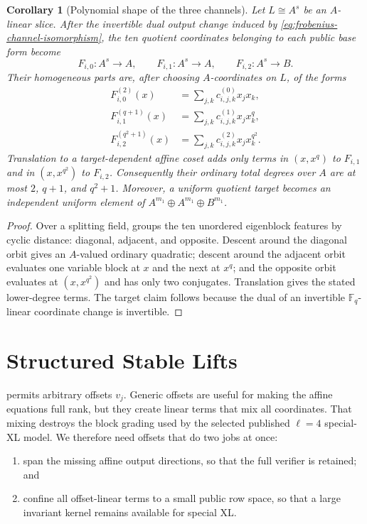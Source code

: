 \documentclass[11pt]{article}
\newtheorem{corollary}[corollary]{Corollary}
\newcommand{\F}{\mathbb F}
\begin{document}
\begin{corollary}[Polynomial shape of the three channels]
\label{cor:frobenius-channel-shape}
Let $L\cong A^s$ be an $A$-linear slice.  After the invertible dual output
change induced by \eqref{eq:frobenius-channel-isomorphism}, the ten quotient
coordinates belonging to each public base form become
\[
 F_{i,0}:A^s\to A,
 \qquad F_{i,1}:A^s\to A,
 \qquad F_{i,2}:A^s\to B.
\]
Their homogeneous parts are, after choosing $A$-coordinates on $L$, of the
forms
\begin{align*}
 F^{(2)}_{i,0}(x)&=\sum_{j,k}c^{(0)}_{i,j,k}x_jx_k,\\
 F^{(q+1)}_{i,1}(x)&=\sum_{j,k}c^{(1)}_{i,j,k}x_jx_k^q,\\
 F^{(q^2+1)}_{i,2}(x)&=\sum_{j,k}c^{(2)}_{i,j,k}x_jx_k^{q^2}.
\end{align*}
Translation to a target-dependent affine coset adds only terms in
$(x,x^q)$ to $F_{i,1}$ and in $(x,x^{q^2})$ to $F_{i,2}$.  Consequently their
ordinary total degrees over $A$ are at most $2$, $q+1$, and $q^2+1$.
Moreover, a uniform quotient target becomes an independent uniform element of
$A^{m_1}\oplus A^{m_1}\oplus B^{m_1}$.
\end{corollary}

\begin{proof}
Over a splitting field,  groups the ten unordered
eigenblock features by cyclic distance: diagonal, adjacent, and opposite.
Descent around the diagonal orbit gives an $A$-valued ordinary quadratic;
descent around the adjacent orbit evaluates one variable block at $x$ and the
next at $x^q$; and the opposite orbit evaluates at $(x,x^{q^2})$ and has only
two conjugates.  Translation gives the stated lower-degree terms.  The target
claim follows because the dual of an invertible $\F_q$-linear coordinate
change is invertible.
\end{proof}

\section{Structured Stable Lifts}\label{sec:structured-lift}

 permits arbitrary offsets $v_j$.  Generic offsets
are useful for making the affine equations full rank, but they create linear
terms that mix all coordinates.  That mixing destroys the block grading used
by the selected published $\ell=4$ special-XL model.  We therefore need offsets
that do two jobs at once:
\begin{enumerate}[label=(\roman*),itemsep=2pt]
\item span the missing affine output directions, so that the full verifier is
      retained; and
\item confine all offset-linear terms to a small public row space, so that a
      large invariant kernel remains available for special XL.\@
\end{enumerate}
\end{document}
